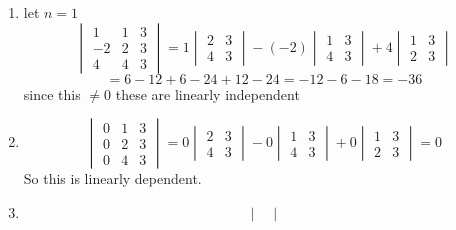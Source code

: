\documentclass[12pt,letterpaper]{article}
\theoremstyle{definition}
\begin{document}
\begin{changemargin}{.5cm}{0cm}
    \begin{enumerate}[label=(\alph*)]
    \item let $n=1$
    \begin{equation*}
        \begin{vmatrix}
            1 & 1 & 3\\
            -2 & 2 & 3\\
            4 & 4 & 3
        \end{vmatrix}=
        1\begin{vmatrix}
            2 & 3\\
            4 & 3
        \end{vmatrix}
        -(-2)\begin{vmatrix}
            1 & 3\\
            4 & 3
        \end{vmatrix}
        +4\begin{vmatrix}
            1 & 3\\
            2 & 3
        \end{vmatrix}
    \end{equation*}
    \begin{equation*}
    = 6-12+ 6-24 + 12-24 = -12-6-18 = -36
   \end{equation*}
   since this $\neq 0$ these are linearly independent
    \item 
    \begin{equation*}
        \begin{vmatrix}
            0 & 1 & 3\\
            0 & 2 & 3\\
            0 & 4 & 3
        \end{vmatrix}=
        0\begin{vmatrix}
            2 & 3\\
            4 & 3
        \end{vmatrix}
        -0\begin{vmatrix}
            1 & 3\\
            4 & 3
        \end{vmatrix}
        +0\begin{vmatrix}
            1 & 3\\
            2 & 3
        \end{vmatrix} = 0
    \end{equation*}
    So this is linearly dependent.
    \item 
    \begin{equation*}
        \begin{vmatrix}

\end{vmatrix}
\end{equation*}
\end{enumerate}
\end{changemargin}
\end{document}
